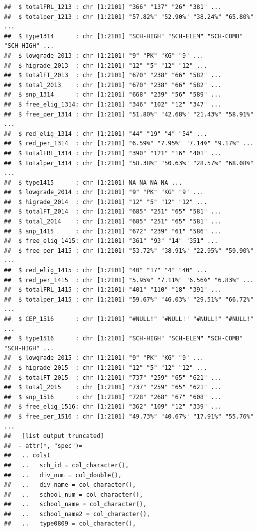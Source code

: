 \documentclass[
]{book}
\begin{document}
\begin{verbatim}
##  $ totalFRL_1213 : chr [1:2101] "366" "137" "26" "381" ...
##  $ totalper_1213 : chr [1:2101] "57.82%" "52.90%" "38.24%" "65.80%" ...
##  $ type1314      : chr [1:2101] "SCH-HIGH" "SCH-ELEM" "SCH-COMB" "SCH-HIGH" ...
##  $ lowgrade_2013 : chr [1:2101] "9" "PK" "KG" "9" ...
##  $ higrade_2013  : chr [1:2101] "12" "5" "12" "12" ...
##  $ totalFT_2013  : chr [1:2101] "670" "238" "66" "582" ...
##  $ total_2013    : chr [1:2101] "670" "238" "66" "582" ...
##  $ snp_1314      : chr [1:2101] "668" "239" "56" "589" ...
##  $ free_elig_1314: chr [1:2101] "346" "102" "12" "347" ...
##  $ free_per_1314 : chr [1:2101] "51.80%" "42.68%" "21.43%" "58.91%" ...
##  $ red_elig_1314 : chr [1:2101] "44" "19" "4" "54" ...
##  $ red_per_1314  : chr [1:2101] "6.59%" "7.95%" "7.14%" "9.17%" ...
##  $ totalFRL_1314 : chr [1:2101] "390" "121" "16" "401" ...
##  $ totalper_1314 : chr [1:2101] "58.38%" "50.63%" "28.57%" "68.08%" ...
##  $ type1415      : chr [1:2101] NA NA NA NA ...
##  $ lowgrade_2014 : chr [1:2101] "9" "PK" "KG" "9" ...
##  $ higrade_2014  : chr [1:2101] "12" "5" "12" "12" ...
##  $ totalFT_2014  : chr [1:2101] "685" "251" "65" "581" ...
##  $ total_2014    : chr [1:2101] "685" "251" "65" "581" ...
##  $ snp_1415      : chr [1:2101] "672" "239" "61" "586" ...
##  $ free_elig_1415: chr [1:2101] "361" "93" "14" "351" ...
##  $ free_per_1415 : chr [1:2101] "53.72%" "38.91%" "22.95%" "59.90%" ...
##  $ red_elig_1415 : chr [1:2101] "40" "17" "4" "40" ...
##  $ red_per_1415  : chr [1:2101] "5.95%" "7.11%" "6.56%" "6.83%" ...
##  $ totalFRL_1415 : chr [1:2101] "401" "110" "18" "391" ...
##  $ totalper_1415 : chr [1:2101] "59.67%" "46.03%" "29.51%" "66.72%" ...
##  $ CEP_1516      : chr [1:2101] "#NULL!" "#NULL!" "#NULL!" "#NULL!" ...
##  $ type1516      : chr [1:2101] "SCH-HIGH" "SCH-ELEM" "SCH-COMB" "SCH-HIGH" ...
##  $ lowgrade_2015 : chr [1:2101] "9" "PK" "KG" "9" ...
##  $ higrade_2015  : chr [1:2101] "12" "5" "12" "12" ...
##  $ totalFT_2015  : chr [1:2101] "737" "259" "65" "621" ...
##  $ total_2015    : chr [1:2101] "737" "259" "65" "621" ...
##  $ snp_1516      : chr [1:2101] "728" "268" "67" "608" ...
##  $ free_elig_1516: chr [1:2101] "362" "109" "12" "339" ...
##  $ free_per_1516 : chr [1:2101] "49.73%" "40.67%" "17.91%" "55.76%" ...
##   [list output truncated]
##  - attr(*, "spec")=
##   .. cols(
##   ..   sch_id = col_character(),
##   ..   div_num = col_double(),
##   ..   div_name = col_character(),
##   ..   school_num = col_character(),
##   ..   school_name = col_character(),
##   ..   school_name2 = col_character(),
##   ..   type0809 = col_character(),

\end{verbatim}
\end{document}
